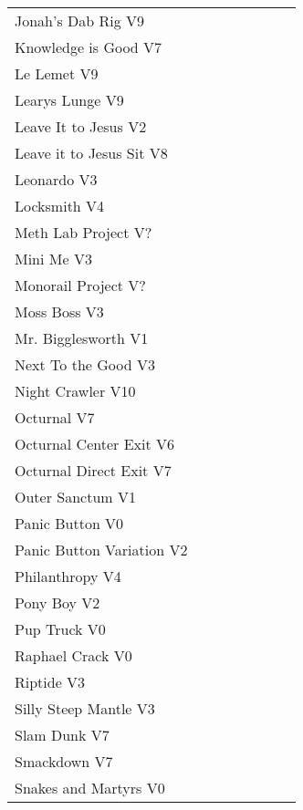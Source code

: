 \begin{center}
\begin{supertabular}{p{0.65\linewidth}r}
Jonah's Dab Rig V9 & \pageref{rt:Jonah's Dab Rig} \\
Knowledge is Good V7 & \pageref{rt:Knowledge is Good} \\
Le Lemet V9 & \pageref{rt:Le Lemet} \\
Learys Lunge V9 & \pageref{rt:Learys Lunge} \\
Leave It to Jesus V2 & \pageref{rt:Leave It to Jesus} \\
Leave it to Jesus Sit V8 & \pageref{vr:Leave it to Jesus Sit} \\
Leonardo V3 & \pageref{rt:Leonardo} \\
Locksmith V4 & \pageref{rt:Locksmith} \\
Meth Lab Project V? & \pageref{rt:Meth Lab Project} \\
Mini Me V3 & \pageref{rt:Mini Me} \\
Monorail Project V? & \pageref{rt:Monorail Project} \\
Moss Boss V3 & \pageref{rt:Moss Boss} \\
Mr. Bigglesworth V1 & \pageref{vr:Mr. Bigglesworth} \\
Next To the Good V3 & \pageref{rt:Next To the Good} \\
Night Crawler V10 & \pageref{rt:Night Crawler} \\
Octurnal V7 & \pageref{rt:Octurnal} \\
Octurnal Center Exit V6 & \pageref{vr:Octurnal Center Exit} \\
Octurnal Direct Exit V7 & \pageref{vr:Octurnal Direct Exit} \\
Outer Sanctum V1 & \pageref{rt:Outer Sanctum} \\
Panic Button V0 & \pageref{rt:Panic Button} \\
Panic Button Variation V2 & \pageref{vr:Panic Button Variation} \\
Philanthropy V4 & \pageref{rt:Philanthropy} \\
Pony Boy V2 & \pageref{rt:Pony Boy} \\
Pup Truck V0 & \pageref{rt:Pup Truck} \\
Raphael Crack V0 & \pageref{rt:Raphael Crack} \\
Riptide V3 & \pageref{rt:Riptide} \\
Silly Steep Mantle V3 & \pageref{rt:Silly Steep Mantle} \\
Slam Dunk V7 & \pageref{rt:Slam Dunk} \\
Smackdown V7 & \pageref{rt:Smackdown} \\
Snakes and Martyrs V0 & \pageref{rt:Snakes and Martyrs} \\

\end{supertabular}
\end{center}
